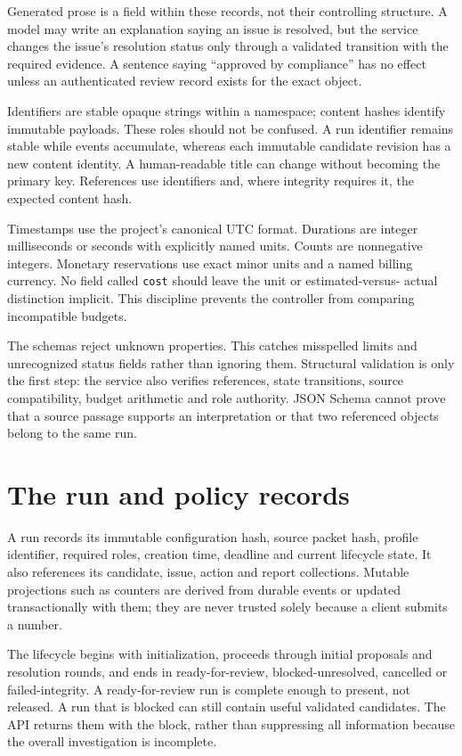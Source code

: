 Generated prose is a field within these records, not their controlling structure.
A model may write an explanation saying an issue is resolved, but the service
changes the issue's resolution status only through a validated transition with
the required evidence. A sentence saying ``approved by compliance'' has no effect
unless an authenticated review record exists for the exact object.

Identifiers are stable opaque strings within a namespace; content hashes identify
immutable payloads. These roles should not be confused. A run identifier remains
stable while events accumulate, whereas each immutable candidate revision has a
new content identity. A human-readable title can change without becoming the
primary key. References use identifiers and, where integrity requires it, the
expected content hash.

Timestamps use the project's canonical UTC format. Durations are integer
milliseconds or seconds with explicitly named units. Counts are nonnegative
integers. Monetary reservations use exact minor units and a named billing
currency. No field called \texttt{cost} should leave the unit or estimated-versus-
actual distinction implicit. This discipline prevents the controller from
comparing incompatible budgets.

The schemas reject unknown properties. This catches misspelled limits and
unrecognized status fields rather than ignoring them. Structural validation is
only the first step: the service also verifies references, state transitions,
source compatibility, budget arithmetic and role authority. JSON Schema cannot
prove that a source passage supports an interpretation or that two referenced
objects belong to the same run.

\section{The run and policy records}
\label{merge:M08:02}


A run records its immutable configuration hash, source packet hash, profile
identifier, required roles, creation time, deadline and current lifecycle state.
It also references its candidate, issue, action and report collections. Mutable
projections such as counters are derived from durable events or updated
transactionally with them; they are never trusted solely because a client submits
a number.

The lifecycle begins with initialization, proceeds through initial proposals and
resolution rounds, and ends in ready-for-review, blocked-unresolved, cancelled or
failed-integrity. A ready-for-review run is complete enough to present, not
released. A run that is blocked can still contain useful validated candidates.
The API returns them with the block, rather than suppressing all information
because the overall investigation is incomplete.

